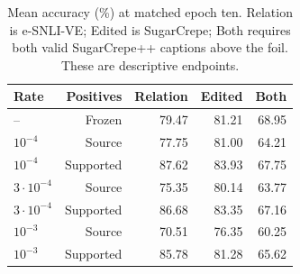 \begin{table}[t]
\nolinenumbers
\centering
\setlength{\tabcolsep}{3pt}
\begin{tabular}{lrrrr}
\toprule
Rate & Positives & Relation & Edited & Both\\
\midrule
-- & Frozen & 79.47 & 81.21 & 68.95\\
$10^{-4}$ & Source & 77.75 & 81.00 & 64.21\\
$10^{-4}$ & Supported & 87.62 & 83.93 & 67.75\\
$3\cdot10^{-4}$ & Source & 75.35 & 80.14 & 63.77\\
$3\cdot10^{-4}$ & Supported & 86.68 & 83.35 & 67.16\\
$10^{-3}$ & Source & 70.51 & 76.35 & 60.25\\
$10^{-3}$ & Supported & 85.78 & 81.28 & 65.62\\
\bottomrule
\end{tabular}
\caption{Mean accuracy (\%) at matched epoch ten. Relation is e-SNLI-VE; Edited is SugarCrepe; Both requires both valid SugarCrepe++ captions above the foil. These are descriptive endpoints.}\label{tab:secondary}
\end{table}
